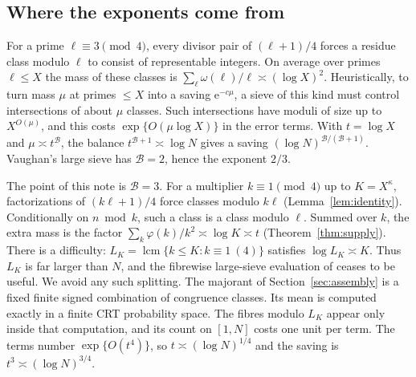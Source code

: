 \documentclass[10pt,reqno]{amsart}
\theoremstyle{remark}
\newcommand{\lcm}{\operatorname{lcm}}
\newcommand{\e}{\mathrm e}
\begin{document}
\subsection*{Where the exponents come from}
For a prime $\ell\equiv3\pmod4$, every divisor pair of $(\ell+1)/4$
forces a residue class modulo $\ell$ to consist of representable integers.
On average over primes $\ell\leq X$ the mass of these classes is
$\sum_\ell\omega(\ell)/\ell\asymp(\log X)^2$.  Heuristically, to turn
mass $\mu$ at primes $\leq X$ into a saving $\e^{-c\mu}$, a sieve of this
kind must
control intersections of about $\mu$ classes.  Such intersections have
moduli of size up to $X^{O(\mu)}$, and this costs $\exp\{O(\mu\log X)\}$
in the error terms.  With $t=\log X$ and $\mu\asymp t^{\mathcal B}$, the
balance $t^{\mathcal B+1}\asymp\log N$ gives a saving
$(\log N)^{\mathcal B/(\mathcal B+1)}$.  Vaughan's large sieve has
$\mathcal B=2$, hence the exponent $2/3$.

The point of this note is $\mathcal B=3$.  For a multiplier $k\equiv1\pmod4$
up to $K=X^\kappa$, factorizations of $(k\ell+1)/4$ force classes modulo
$k\ell$ (Lemma~\ref{lem:identity}).  Conditionally on $n\bmod k$, such a
class is a class modulo $\ell$.  Summed over $k$, the extra mass is the
factor $\sum_k\varphi(k)/k^2\asymp\log K\asymp t$
(Theorem~\ref{thm:supply}).  There is a difficulty: $L_K=\lcm\{k\leq K:
k\equiv1\ (4)\}$
satisfies $\log L_K\asymp K$.
Thus $L_K$ is far larger than $N$, and the fibrewise large-sieve evaluation
of \cite{LL} ceases to be useful.  We avoid any such splitting.
The majorant of Section~\ref{sec:assembly} is a fixed finite
signed combination of congruence classes.  Its mean is computed exactly in
a finite CRT probability space.  The fibres modulo $L_K$ appear only
inside that computation, and its count on $[1,N]$ costs one unit per term.
The terms number $\exp\{O(t^4)\}$, so $t\asymp(\log N)^{1/4}$ and the
saving is $t^3\asymp(\log N)^{3/4}$.
\end{document}
